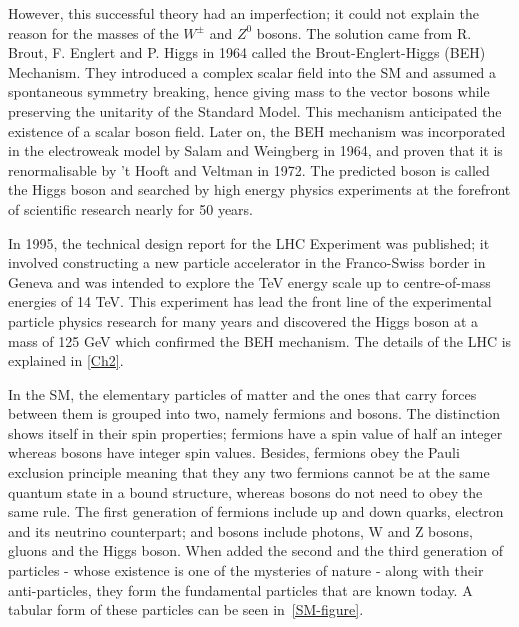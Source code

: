 However, this successful theory had an imperfection; it could not explain the reason for the masses of the $W^\pm$ and $Z^0$ bosons. The solution came from R. Brout, F. Englert and P. Higgs in 1964 called the Brout-Englert-Higgs (BEH) Mechanism\cite{Higgs1964, BroutEnglert, Guralnik1964}. They introduced a complex scalar field into the SM and assumed a spontaneous symmetry breaking, hence giving mass to the vector bosons while preserving the unitarity of the Standard Model. This mechanism anticipated the existence of a scalar boson field. Later on, the BEH mechanism was incorporated in the electroweak model by Salam and Weingberg in 1964\cite{salam}, and proven that it is renormalisable by 't Hooft and Veltman in 1972\cite{thooft}. The predicted boson is called the Higgs boson and searched by high energy physics experiments at the forefront of scientific research nearly for 50 years.

In 1995, the technical design report for the LHC Experiment was published\cite{lhc-tdr}; it involved constructing a new particle accelerator in the Franco-Swiss border in Geneva and was intended to explore the TeV energy scale up to centre-of-mass energies of 14 TeV. This experiment has lead the front line of the experimental particle physics research for many years and discovered the Higgs boson at a mass of 125 GeV which confirmed the BEH mechanism. The details of the LHC is explained in \autoref{Ch2}.

In the SM, the elementary particles of matter and the ones that carry forces between them is grouped into two, namely fermions and bosons. The distinction shows itself in their spin properties; fermions have a spin value of half an integer whereas bosons have integer spin values. Besides, fermions obey the Pauli exclusion principle meaning that they any two fermions cannot be at the same quantum state in a bound structure, whereas bosons do not need to obey the same rule. The first generation of fermions include up and down quarks, electron and its neutrino counterpart; and bosons include photons, W and Z bosons, gluons and the Higgs boson. When added the second and the third generation of particles - whose existence is one of the mysteries of nature - along with their anti-particles, they form the fundamental particles that are known today. A tabular form of these particles can be seen in~\autoref{SM-figure}.

